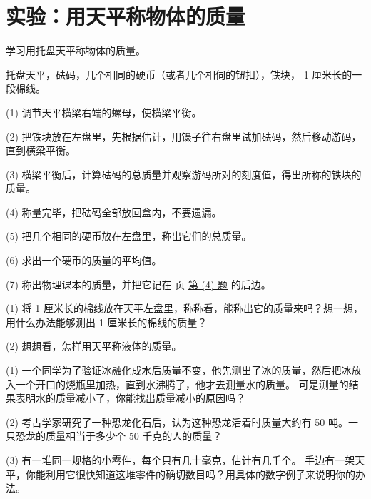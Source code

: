\section{实验：用天平称物体的质量}\label{sec:1-7}

 学习用托盘天平称物体的质量。

 托盘天平，砝码，几个相同的硬币（或者几个相伺的钮扣），铁块， 1 厘米长的一段棉线。


(1) 调节天平横梁右端的螺母，使横梁平衡。

(2) 把铁块放在左盘里，先根据估计，用镊子往右盘里试加砝码，然后移动游码，直到横梁平衡。

(3) 横梁平衡后，计算砝码的总质量并观察游码所对的刻度值，得出所称的铁块的质量。

(4) 称量完毕，把砝码全部放回盒内，不要遗漏。

(5) 把几个相同的硬币放在左盘里，称出它们的总质量。

(6) 求出一个硬币的质量的平均值。

(7) 称出物理课本的质量，并把它记在\pageref{shiyong-keben-zhiliang} 页 \hyperref[shiyong-keben-zhiliang]{第 (4) 题} 的后边。


(1) 将 1 厘米长的棉线放在天平左盘里，称称看，能称出它的质量来吗？想一想，用什么办法能够测出 1 厘米长的棉线的质量？

(2) 想想看，怎样用天平称液体的质量。

\lianxi

(1) 一个同学为了验证冰融化成水后质量不变，他先测出了冰的质量，然后把冰放入一个开口的烧瓶里加热，直到水沸腾了，他才去测量水的质量。
可是测量的结果表明水的质量减小了，你能找出质量减小的原因吗？

(2) 考古学家研究了一种恐龙化石后，认为这种恐龙活着时质量大约有 50 吨。一只恐龙的质量相当于多少个 50 千克的人的质量？

(3) 有一堆同一规格的小零件，每个只有几十毫克，估计有几千个。
手边有一架天平，你能利用它很快知道这堆零件的确切数目吗？用具体的数字例子来说明你的办法。

